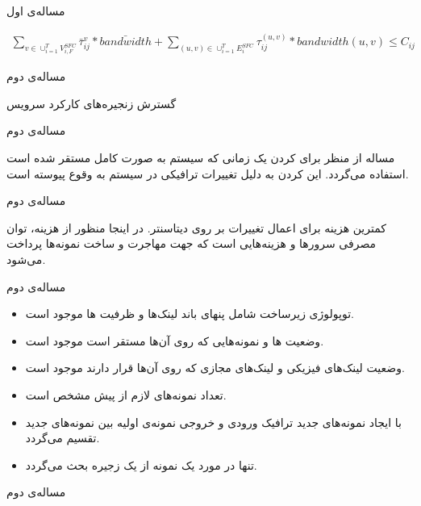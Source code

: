 \documentclass{beamer}
\makeatletter
\newcommand{\RTList}{\raggedleft\rightskip\@totalleftmargin}
\makeatother
\begin{document}
\begin{persian}
\begin{frame}{مساله‌ی اول}
	\begin{latin}\begin{align}
		\sum_{v \in \cup_{i=1}^{T} V_{i,F}^{SFC}} \bar{\tau}_{ij}^{v} * \bar{bandwidth} + \sum_{(u,v) \in \cup_{i=1}^{T} E_{i}^{SFC}} \tau_{ij}^{(u,v)} * bandwidth(u,v) \le C_{ij}
	\end{align}\end{latin}
\end{frame}
\begin{frame}
	\begin{multicols}{3}
		\begin{center}	
			مساله‌ی دوم
		\end{center}
	\end{multicols}
	\begin{center}	
		گسترش زنجیره‌های کارکرد سرویس
	\end{center}
\end{frame}
\begin{frame}{مساله‌ی دوم}
	\par
	مساله از منظر  برای  کردن یک 
	زمانی که سیستم به صورت کامل مستقر شده است استفاده می‌گردد.
	این  کردن به دلیل تغییرات ترافیکی در سیستم به وقوع پیوسته است.
\end{frame}
\begin{frame}{مساله‌ی دوم}
	\par
	کمترین هزینه برای اعمال تغییرات بر روی دیتاسنتر.
	در اینجا منظور از هزینه، توان مصرفی سرورها و هزینه‌هایی است که جهت مهاجرت و ساخت نمونه‌ها پرداخت می‌شود.
\end{frame}
\begin{frame}{مساله‌ی دوم}
	\begin{itemize}\RTList{}
		\item توپولوژی زیرساخت شامل پنهای باند لینک‌ها و ظرفیت ها موجود است.
		\item وضعیت ها و نمونه‌هایی که روی آن‌ها مستقر است موجود است.
		\item وضعیت لینک‌های فیزیکی و لینک‌های مجازی که روی آن‌ها قرار دارند موجود است.
		\item تعداد نمونه‌های لازم از پیش مشخص است.
		\item با ایجاد نمونه‌های جدید ترافیک ورودی و خروجی نمونه‌ی اولیه بین نمونه‌های جدید تقسیم می‌گردد.
		\item تنها در مورد یک نمونه از یک زجیره بحث می‌گردد.
	\end{itemize}
\end{frame}
\begin{frame}{مساله‌ی دوم}

\end{frame}
\end{persian}
\end{document}
